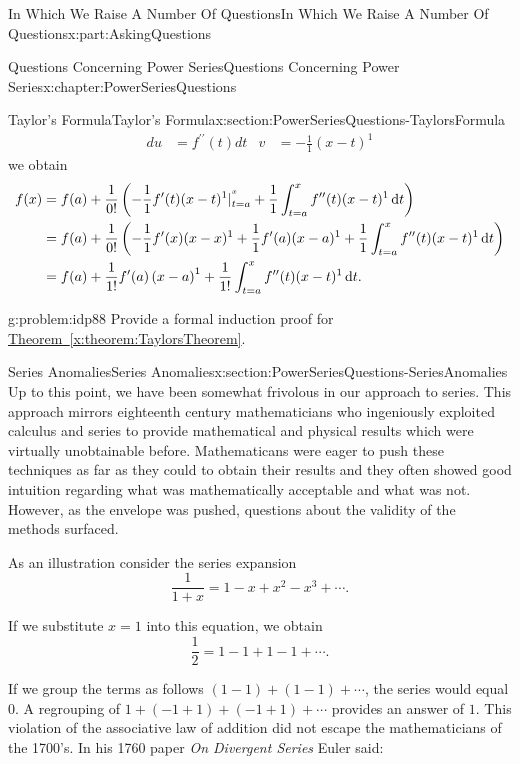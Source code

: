 \documentclass[oneside,10pt,]{book}
\newcommand{\xreffont}{\relax}
\numberwithin{equation}{section}
\newcommand{\dx}[1]{\,{\rm d}#1}
\newcommand{\amp}{&}
\begin{document}
\begin{partptx}{In Which We Raise A Number Of Questions}{}{In Which We Raise A Number Of Questions}{}{}{x:part:AskingQuestions}
\begin{chapterptx}{Questions Concerning Power Series}{}{Questions Concerning Power Series}{}{}{x:chapter:PowerSeriesQuestions}
\begin{sectionptx}{Taylor's Formula}{}{Taylor's Formula}{}{}{x:section:PowerSeriesQuestions-TaylorsFormula}
\begin{align*}
d u\amp =f^{\prime\prime}(t)d t\amp  v\amp =-\frac{1}{1}(x-t)^1
\end{align*}
we obtain%
\begin{align*}
f(x)\amp =f(a)+\frac{1}{0!}\left(-\frac{1}{1}f^\prime(t)(x-t)^1|_{t=a}^{^x}+\frac{1}{1} \int_{t=a}^xf^{\prime\prime}(t)(x-t)^1\dx{ t}\right)\\
\amp =f(a)+\frac{1}{0!}\left(-\frac{1}{1}f^\prime(x)(x-x)^1+ \frac{1}{1}f^\prime(a)(x-a)^1+\frac{1}{1}\int_{t=a}^xf^{\prime\prime}(t)(x-t)^1\dx{ t}\right)\\
\amp =f(a)+\frac{1}{1!}f^\prime(a)\left(x-a\right)^1 + \frac{1}{1!}\int_{t=a}^xf^{\prime\prime}(t)(x-t)^1\dx{ t}\text{.}
\end{align*}
%
\begin{problem}{}{g:problem:idp88}%
 Provide a formal induction proof for \hyperref[x:theorem:TaylorsTheorem]{Theorem~{\xreffont\ref{x:theorem:TaylorsTheorem}}}.%
\end{problem}
\end{sectionptx}
%
%
\typeout{************************************************}
\typeout{************************************************}
%
\begin{sectionptx}{Series Anomalies}{}{Series Anomalies}{}{}{x:section:PowerSeriesQuestions-SeriesAnomalies}
Up to this point, we have been somewhat frivolous in our approach to series. This approach mirrors eighteenth century mathematicians who ingeniously exploited calculus and series to provide mathematical and physical results which were virtually unobtainable before. Mathematicans were eager to push these techniques as far as they could to obtain their results and they often showed good intuition regarding what was mathematically acceptable and what was not. However, as the envelope was pushed, questions about the validity of the methods surfaced.%
\par
As an illustration consider the series expansion%
\begin{equation*}
\frac{1}{1+x}=1-x+x^2-x^3+\cdots\text{.}
\end{equation*}
%
\par
If we substitute \(x=1\) into this equation, we obtain%
\begin{equation*}
\frac{1}{2}=1-1+1-1+\cdots\text{.}
\end{equation*}
%
\par
If we group the terms as follows \((1-1)+(1-1)+\cdots\), the series would equal \(0\). A regrouping of \(1+(-1+1)+(-1+1)+\cdots\) provides an answer of \(1\). This violation of the associative law of addition did not escape the mathematicians of the 1700's. In his 1760 paper \emph{On Divergent Series} Euler  said:%

\end{sectionptx}
\end{chapterptx}
\end{partptx}
\end{document}
